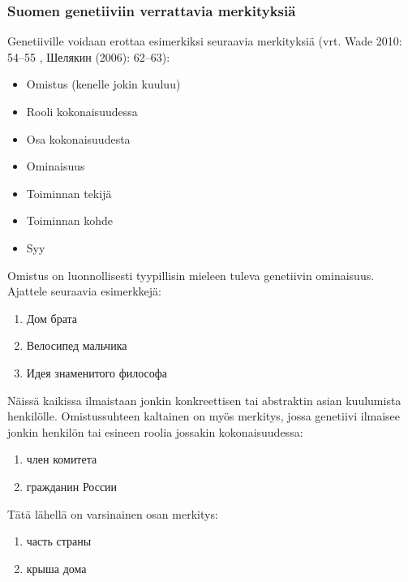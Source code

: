 \documentclass[]{scrartcl}
\providecommand{\tightlist}{%
  \setlength{\itemsep}{0pt}\setlength{\parskip}{0pt}}
\begin{document}
\subsubsection{Suomen genetiiviin verrattavia
merkityksiä}\label{suomen-genetiiviin-verrattavia-merkityksiuxe4}

Genetiiville voidaan erottaa esimerkiksi seuraavia merkityksiä (vrt.
Wade 2010: 54--55 , Шелякин (2006): 62--63):

\begin{itemize}
\tightlist
\item
  Omistus (kenelle jokin kuuluu)
\item
  Rooli kokonaisuudessa
\item
  Osa kokonaisuudesta
\item
  Ominaisuus
\item
  Toiminnan tekijä
\item
  Toiminnan kohde
\item
  Syy
\end{itemize}

Omistus on luonnollisesti tyypillisin mieleen tuleva genetiivin
ominaisuus. Ajattele seuraavia esimerkkejä:

\begin{enumerate}
\def\labelenumi{(\arabic{enumi})}
\setcounter{enumi}{23}
\tightlist
\item
  Дом брата
\item
  Велосипед мальчика
\item
  Идея знаменитого философа
\end{enumerate}

Näissä kaikissa ilmaistaan jonkin konkreettisen tai abstraktin asian
kuulumista henkilölle. Omistussuhteen kaltainen on myös merkitys, jossa
genetiivi ilmaisee jonkin henkilön tai esineen roolia jossakin
kokonaisuudessa:

\begin{enumerate}
\def\labelenumi{(\arabic{enumi})}
\setcounter{enumi}{26}
\tightlist
\item
  член комитета
\item
  гражданин России
\end{enumerate}

Tätä lähellä on varsinainen osan merkitys:

\begin{enumerate}
\def\labelenumi{(\arabic{enumi})}
\setcounter{enumi}{28}
\tightlist
\item
  часть страны
\item
  крыша дома
\end{enumerate}
\end{document}
